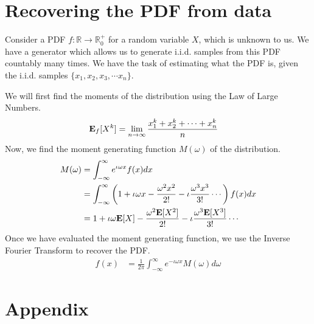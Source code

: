 \documentclass[12pt]{article}
\begin{document}
\section{Recovering the PDF from data}
Consider a PDF $f : \mathbb{R} \to \mathbb{R}^+_0$ for a random variable $X$, which is unknown to us. We have a generator which allows us to generate i.i.d. samples from this PDF countably many times. We have the task of estimating what the PDF is, given the i.i.d. samples $\{x_1,x_2, x_3, \cdots x_n\}$.

We will first find the moments of the distribution using the Law of Large Numbers.
\begin{align*}
    {\bf E}_f[X^k] &= \lim_{n \to \infty} \frac{x_1^k + x_2^k +  \cdots + x_n^k}{n}
\end{align*}
Now, we find the moment generating function $M(\omega)$ of the distribution.
\begin{align*}
    M(\omega) &= \int_{-\infty}^{\infty} e^{\iota \omega x} f(x) dx\\
              &= \int_{-\infty}^{\infty} \left( 1 + \iota \omega x - \frac{\omega^2 x^2}{2!} - \iota \frac{\omega^3 x^3}{3!} \cdots \right) f(x)dx\\
              &= 1 + \iota \omega {\bf E}[X] - \frac{\omega^2 {\bf E}[X^2]}{2!} - \iota \frac{\omega^3 {\bf E}[X^3]}{3!} \cdots
\end{align*}
Once we have evaluated the moment generating function, we use the Inverse Fourier Transform to recover the PDF.
\begin{align*}
    f(x) &= \frac{1}{2\pi}\int_{-\infty}^{\infty} e^{-\iota \omega x} M(\omega) d\omega
\end{align*}


\section{Appendix}
\label{Appendix}
\end{document}
